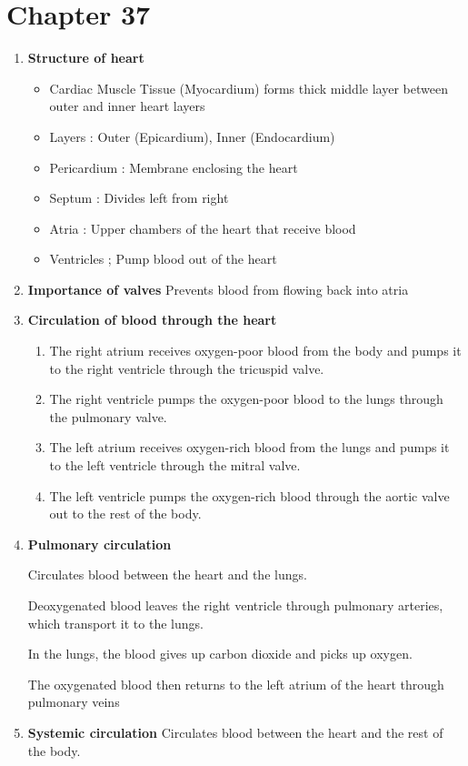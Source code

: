 \documentclass[9pt]{article}
\begin{document}
\section*{Chapter 37}
\begin{enumerate}
  \item {\bf Structure of heart}
  \begin{itemize}
  \item Cardiac Muscle Tissue (Myocardium) forms thick middle layer between outer and inner heart layers
  \item Layers : Outer (Epicardium), Inner (Endocardium)
  \item Pericardium : Membrane enclosing the heart
  \item Septum : Divides left from right
  \item Atria : Upper chambers of the heart that receive blood
  \item Ventricles ; Pump blood out of the heart
  \end{itemize}
  \item {\bf Importance of valves} Prevents blood from flowing back into atria
  \item {\bf Circulation of blood through the heart} 
  \begin{enumerate}
  \item The right atrium receives oxygen-poor blood from the body and pumps it to the right ventricle through the tricuspid valve.
  \item The right ventricle pumps the oxygen-poor blood to the lungs through the pulmonary valve.
  \item The left atrium receives oxygen-rich blood from the lungs and pumps it to the left ventricle through the mitral valve.
  \item The left ventricle pumps the oxygen-rich blood through the aortic valve out to the rest of the body.
  \end{enumerate}
  \item {\bf Pulmonary circulation}

   Circulates blood between the heart and the lungs. 

   Deoxygenated blood leaves the right ventricle through pulmonary arteries, which transport it to the lungs.

   In the lungs, the blood gives up carbon dioxide and picks up oxygen.

   The oxygenated blood then returns to the left atrium of the heart through pulmonary veins
  \item {\bf Systemic circulation} Circulates blood between the heart and the rest of the body. 


\end{enumerate}
\end{document}
